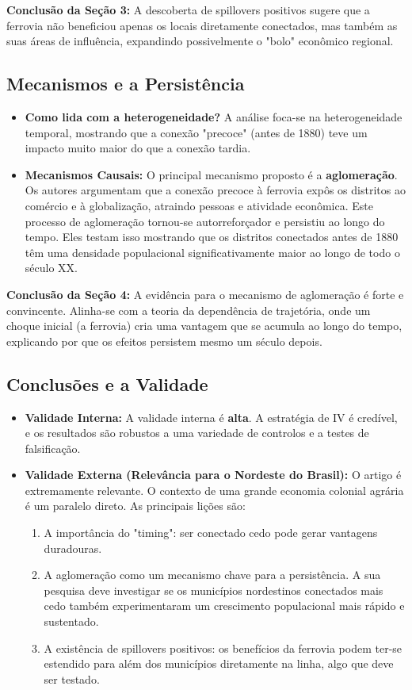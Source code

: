 \documentclass[12pt, a4paper]{article}
\begin{document}
\noindent\textbf{Conclusão da Seção 3:} A descoberta de spillovers positivos sugere que a ferrovia não beneficiou apenas os locais diretamente conectados, mas também as suas áreas de influência, expandindo possivelmente o "bolo" econômico regional.

\subsection{Mecanismos e a Persistência}

\begin{itemize}
    \item \textbf{Como lida com a heterogeneidade?} A análise foca-se na heterogeneidade temporal, mostrando que a conexão "precoce" (antes de 1880) teve um impacto muito maior do que a conexão tardia.
    \item \textbf{Mecanismos Causais:} O principal mecanismo proposto é a \textbf{aglomeração}. Os autores argumentam que a conexão precoce à ferrovia expôs os distritos ao comércio e à globalização, atraindo pessoas e atividade econômica. Este processo de aglomeração tornou-se autorreforçador e persistiu ao longo do tempo. Eles testam isso mostrando que os distritos conectados antes de 1880 têm uma densidade populacional significativamente maior ao longo de todo o século XX.
\end{itemize}

\noindent\textbf{Conclusão da Seção 4:} A evidência para o mecanismo de aglomeração é forte e convincente. Alinha-se com a teoria da dependência de trajetória, onde um choque inicial (a ferrovia) cria uma vantagem que se acumula ao longo do tempo, explicando por que os efeitos persistem mesmo um século depois.

\subsection{Conclusões e a Validade}
\begin{itemize}
    \item \textbf{Validade Interna:} A validade interna é \textbf{alta}. A estratégia de IV é credível, e os resultados são robustos a uma variedade de controlos e a testes de falsificação.
    \item \textbf{Validade Externa (Relevância para o Nordeste do Brasil):} O artigo é extremamente relevante. O contexto de uma grande economia colonial agrária é um paralelo direto. As principais lições são:
        \begin{enumerate}
            \item A importância do "timing": ser conectado cedo pode gerar vantagens duradouras.
            \item A aglomeração como um mecanismo chave para a persistência. A sua pesquisa deve investigar se os municípios nordestinos conectados mais cedo também experimentaram um crescimento populacional mais rápido e sustentado.
            \item A existência de spillovers positivos: os benefícios da ferrovia podem ter-se estendido para além dos municípios diretamente na linha, algo que deve ser testado.
        \end{enumerate}
\end{itemize}
\end{document}
